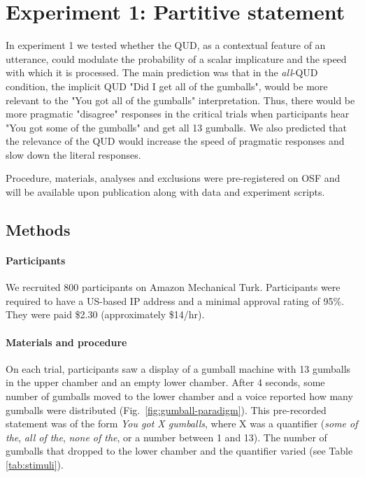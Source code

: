 \documentclass[10pt,letterpaper]{article}
\begin{document}

\section{Experiment 1: Partitive statement}

In experiment 1 we tested whether the QUD, as a contextual feature of an utterance, could modulate the probability of a scalar implicature and the speed with which it is processed. The main prediction was that in the \textit{all}-QUD condition, the implicit QUD "Did I get all of the gumballs", would be more relevant to the "You got all of the gumballs" interpretation. Thus, there would be more pragmatic "disagree" responses in the critical trials when participants hear "You got some of the gumballs" and get all 13 gumballs. We also predicted that the relevance of the QUD would increase the speed of pragmatic responses and slow down the literal responses.

Procedure, materials, analyses and exclusions were pre-registered on OSF and will be available upon publication along with data and experiment scripts.

\subsection{Methods}

\paragraph{Participants}
We recruited 800 participants on Amazon Mechanical Turk. Participants were required to have a US-based IP address and a minimal approval rating of 95\%. They were paid \$2.30 (approximately \$14/hr).

\paragraph{Materials and procedure}

On each trial, participants saw a display of a gumball machine with 13 gumballs in the upper chamber and an empty lower chamber. After 4 seconds, some number of gumballs moved to the lower chamber and a voice reported how many gumballs were distributed (Fig.~\ref{fig:gumball-paradigm}). This pre-recorded statement was of the form \emph{You got X gumballs}, where X was a quantifier (\textit{some of the},  \textit{all of the}, \textit{none of the}, or a number between 1 and 13). The number of gumballs that dropped to the lower chamber and the quantifier  varied (see Table \ref{tab:stimuli}).
\end{document}
